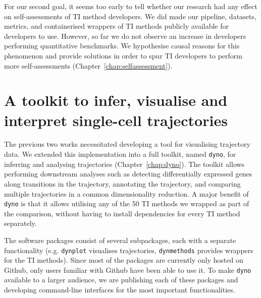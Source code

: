 For our second goal, it seems too early to tell whether our research had any effect on self-assessments of TI method developers. We did made our pipeline, datasets, metrics, and containerised wrappers of TI methods publicly available for developers to use.
However, so far we do not observe an increase in developers performing quantitative benchmarks. We hypothesise causal reasons for this phenomenon and provide solutions in order to spur TI developers to perform more self-assessments (Chapter~\ref{chap:selfassessment}).
\section{A toolkit to infer, visualise and interpret single-cell trajectories}

The previous two works necessitated developing a tool for visualising trajectory data. We extended this implementation into a full toolkit, named \texttt{dyno}, for inferring and analysing trajectories (Chapter~\ref{chap:dyno}). The toolkit allows performing downstream analyses such as detecting differentially expressed genes along transitions in the trajectory, annotating the trajectory, and comparing multiple trajectories in a common dimensionality reduction. A major benefit of \texttt{dyno} is that it allows utilising any of the 50 TI methods we wrapped as part of the comparison, without having to install dependencies for every TI method separately.

The software packages consist of several subpackages, each with a separate functionality (e.g. \texttt{dynplot} visualises trajectories, \texttt{dynmethods} provides wrappers for the TI methods). Since most of the packages are currently only hosted on Github, only users familiar with Github have been able to use it. To make \texttt{dyno} available to a larger audience, we are publishing each of these packages and developing command-line interfaces for the most important functionalities.


